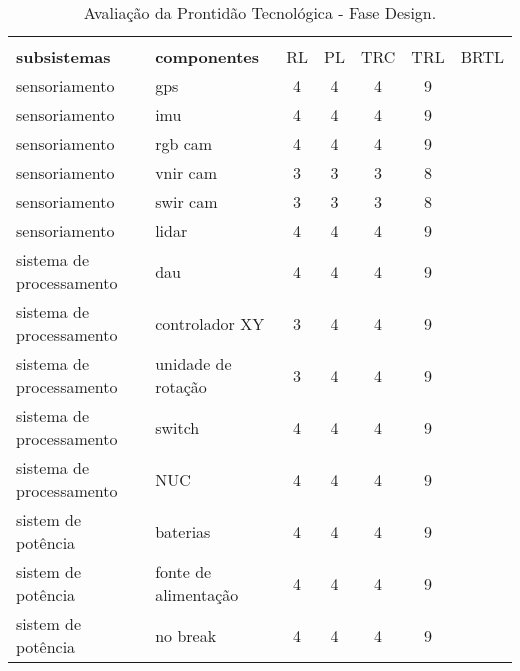 \begin{table}[h]
\centering
\caption{Avaliação da Prontidão Tecnológica - Fase Design.}
\label{tabela:TRL_FC}
\begin{tabular}{llccccl}
\rowcolor[HTML]{000000} 
\multicolumn{7}{l}{\cellcolor[HTML]{000000}{\color[HTML]{FFFFFF} FASE DESIGN}} \\
\rowcolor[HTML]{EFEFEF} 
\textbf{subsistemas} 		& \textbf{componentes} 				& RL & PL & TRC & TRL & BRTL\\ \hline
sensoriamento				& gps								& 4	 & 4  & 4	& 9	  & \cellcolor[HTML]{009901}\\ \hline
sensoriamento				& imu								& 4	 & 4  & 4	& 9	  & \cellcolor[HTML]{009901}\\ \hline
sensoriamento				& rgb cam							& 4	 & 4  & 4	& 9	  & \cellcolor[HTML]{009901}\\ \hline
sensoriamento				& vnir cam							& 3	 & 3  & 3	& 8	  & \cellcolor[HTML]{009901}\\ \hline
sensoriamento				& swir cam							& 3	 & 3  & 3	& 8	  & \cellcolor[HTML]{009901}\\ \hline
sensoriamento				& lidar								& 4	 & 4  & 4	& 9	  & \cellcolor[HTML]{009901}\\ \hline
sistema de processamento	    & dau								& 4	 & 4  & 4	& 9	  & \cellcolor[HTML]{009901}\\ \hline
sistema de processamento 	& controlador XY						& 3	 & 4  & 4	& 9	  & \cellcolor[HTML]{009901}\\ \hline
sistema de processamento 	& unidade de rotação					& 3	 & 4  & 4	& 9	  & \cellcolor[HTML]{009901}\\ \hline
sistema de processamento 	& switch								& 4	 & 4  & 4	& 9	  & \cellcolor[HTML]{009901}\\ \hline
sistema de processamento 	& NUC								& 4	 & 4  & 4	& 9	  & \cellcolor[HTML]{009901}\\ \hline
sistem de potência			& baterias							& 4	 & 4  & 4	& 9	  & \cellcolor[HTML]{009901}\\ \hline
sistem de potência			& fonte de alimentação				& 4	 & 4  & 4	& 9	  & \cellcolor[HTML]{009901}\\ \hline
sistem de potência			& no break							& 4	 & 4  & 4	& 9   & \cellcolor[HTML]{009901}\\ \hline

\end{tabular}
\end{table}

